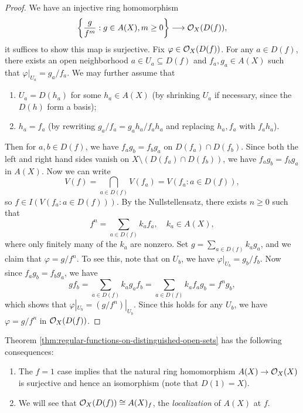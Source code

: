 \begin{proof}
  We have an injective ring homomorphism
  \[
    \left\{
      \frac{g}{f^m} : g \in A(X), m \ge 0
    \right\}
    \longrightarrow \mathcal{O}_X(D(f)),
  \]
  it suffices to show this map is
  surjective. Fix $\varphi \in \mathcal{O}_X(D(f))$.
  For any $a \in D(f)$, there exists an
  open neighborhood $a \in U_a \subseteq D(f)$
  and $f_a, g_a \in A(X)$ such that
  $\varphi|_{U_a} = g_a / f_a$.
  We may further assume that
  \begin{enumerate}
    \item $U_a = D(h_a)$ for
      some $h_a \in A(X)$ (by shrinking
      $U_a$ if necessary, since the
      $D(h)$ form a basis);
    \item $h_a = f_a$ (by rewriting
      $g_a / f_a = g_a h_a / f_a h_a$ and
      replacing $h_a, f_a$ with $f_a h_a$).
  \end{enumerate}
  Then for $a, b \in D(f)$, we have
  $f_a g_b = f_b g_a$ on $D(f_a) \cap D(f_b)$.
  Since both the left and right hand
  sides
  vanish on $X \setminus (D(f_a) \cap D(f_b))$,
  we have $f_a g_b = f_b g_a$ in $A(X)$.
  Now we can write
  \[
    V(f) = \bigcap_{a \in D(f)} V(f_a)
    = V(f_a : a \in D(f)),
  \]
  so $f \in I(V(f_a : a \in D(f)))$.
  By the Nullstellensatz, there exists
  $n \ge 0$ such that
  \[
    f^n = \sum_{a \in D(f)} k_a f_a, \quad
    k_a \in A(X),
  \]
  where only finitely many of the $k_a$
  are nonzero. Set
  $g = \sum_{a \in D(f)} k_a g_a$, and
  we claim that $\varphi = g / f^n$. To
  see this, note that on $U_b$, we have
  $\varphi|_{U_b} = g_b / f_b$. Now
  since $f_a g_b = f_b g_a$, we have
  \[
    g f_b
    = \sum_{a \in D(f)} k_a g_a f_b
    = \sum_{a \in D(f)} k_a f_a g_b
    = f^n g_b,
  \]
  which shows that $\varphi|_{U_b} = (g / f^n)|_{U_b}$.
  Since this holds for any $U_b$,
  we have $\varphi = g / f^n$ in
  $\mathcal{O}_X(D(f))$.
\end{proof}

\begin{remark}
  Theorem \ref{thm:regular-functions-on-distinguished-open-sets}
  has the following consequences:
  \begin{enumerate}
    \item The $f = 1$ case implies that the
    natural ring homomorphism
    $A(X) \to \mathcal{O}_X(X)$ is surjective
    and hence an isomorphism (note that
    $D(1) = X$).
    \item We will see that
      $\mathcal{O}_X(D(f)) \cong A(X)_f$,
      the \emph{localization} of $A(X)$ at $f$.
  \end{enumerate}
\end{remark}

